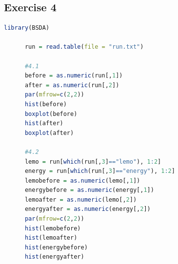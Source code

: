 \documentclass{article}
\begin{document}
    \subsection{Exercise 4}\label{sec:RE4}
      \begin{lstlisting}[language=R]
      library(BSDA)

      run = read.table(file = "run.txt")

      #4.1
      before = as.numeric(run[,1])
      after = as.numeric(run[,2])
      par(mfrow=c(2,2))
      hist(before)
      boxplot(before)
      hist(after)
      boxplot(after)

      #4.2
      lemo = run[which(run[,3]=="lemo"), 1:2]
      energy = run[which(run[,3]=="energy"), 1:2]
      lemobefore = as.numeric(lemo[,1])
      energybefore = as.numeric(energy[,1])
      lemoafter = as.numeric(lemo[,2])
      energyafter = as.numeric(energy[,2])
      par(mfrow=c(2,2))
      hist(lemobefore)
      hist(lemoafter)
      hist(energybefore)
      hist(energyafter)
      \end{lstlisting}
\end{document}
